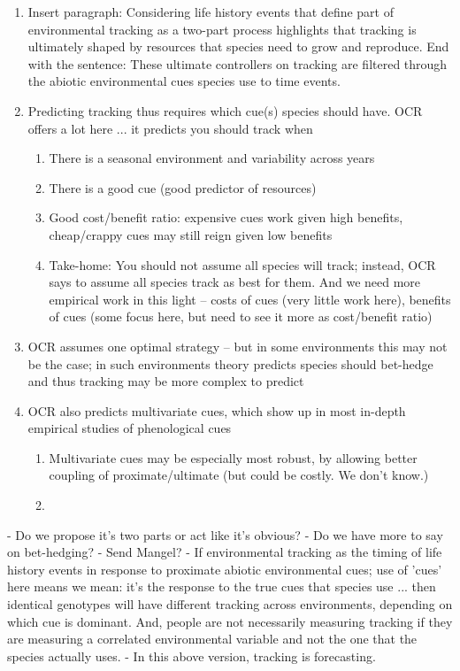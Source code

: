 \documentclass[11pt,letterpaper]{article}
\begin{document}
\begin{enumerate}
\begin{enumerate}
\item Insert paragraph: Considering life history events that define part of environmental tracking as a two-part process highlights that tracking is ultimately shaped by resources that species need to grow and reproduce. End with the sentence: These ultimate controllers on tracking are filtered through the abiotic environmental cues species use to time events.  
\item Predicting tracking thus requires which cue(s) species should have. OCR offers a lot here ... it predicts you should track when
\begin{enumerate}
\item There is a seasonal environment and variability across years
\item There is a good cue (good predictor of resources)
\item Good cost/benefit ratio: expensive cues work given high benefits, cheap/crappy cues may still reign given low benefits
\item Take-home: You should not assume all species will track; instead, OCR says to assume all species track as best for them. And we need more empirical work in this light -- costs of cues (very little work here), benefits of cues (some focus here, but need to see it more as cost/benefit ratio)
\end{enumerate}
\item OCR assumes one optimal strategy -- but in some environments this may not be the case; in such environments theory predicts species should bet-hedge and thus tracking may be more complex to predict
\item OCR also predicts multivariate cues, which show up in most in-depth empirical studies of phenological cues 
\begin{enumerate}
\item Multivariate cues may be especially most robust, by allowing better coupling of proximate/ultimate (but could be costly. We don't know.)
\item 
\end{enumerate}
\end{enumerate}
\end{enumerate}



- Do we propose it's two parts or act like it's obvious?
- Do we have more to say on bet-hedging?
- Send Mangel?
- If environmental tracking as the timing of life history events in response to proximate abiotic environmental cues; use of 'cues' here means we mean: it's the response to the true cues that species use ... then identical genotypes will have different tracking across environments, depending on which cue is dominant. And, people are not necessarily measuring tracking if they are measuring a correlated environmental variable and not the one that the species actually uses. 
- In this above version, tracking is forecasting. 
\end{document}
